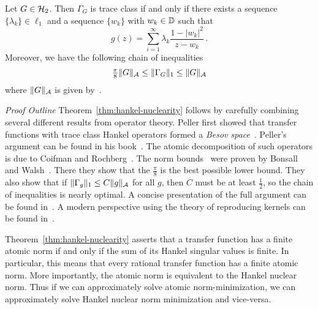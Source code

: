 \begin{theorem}\label{thm:hankel-nuclearity}
Let $G \in \mathcal{H}_2$.  Then $\Gamma_G$ is trace class if and only if there exists a sequence $\{\lambda_k\} \in \ell_1$ and a
    sequence $\{w_k\}$ with $w_k \in \mathbb{D}$ such that
\begin{equation}\label{eq:kernel-form}
    g(z) = \sum_{i=1}^\infty \lambda_k \frac{1-|w_k|^2}{z-w_k}\,.
    \end{equation}
Moreover, we have the following chain of inequalities
\begin{equation}\label{eq:norm-ineq-chain}
\tfrac{\pi}{8}\|G\|_{\mathcal{A}} \leq  \|\Gamma_G\|_1 \leq
\|G\|_{\mathcal{A}} 
\end{equation}
where  $\|G\|_{\mathcal{A}}$ is given by~.
\end{theorem}
\emph{Proof Outline}  Theorem~\ref{thm:hankel-nuclearity} follows by carefully combining several different results from operator theory. Peller first showed that transfer functions with trace class Hankel operators formed a \emph{Besov space}~\cite{Peller79}. Peller's argument can be found in his book~\cite{PellerHankelBook}. The atomic decomposition of such operators is due to Coifman and Rochberg~\cite{Coifman80}. The norm bounds~ were proven by Bonsall and Walsh~\cite{Bonsall86}. There they show that the $\tfrac{\pi}{8}$ is the best possible lower bound.  They also show that if $\|\Gamma_g\|_1\leq C\|g\|_{\mathcal{A}}$ for all $g$, then $C$ must be at least $\tfrac{1}{2}$, so the chain of inequalities is nearly optimal. A concise presentation of the full argument can be found  in~\cite{PartingtonHankelBook}. A modern perspective using the theory of reproducing kernels can be found in~\cite{ZhuBook}. 
\vspace{1mm}

\noindent Theorem~\ref{thm:hankel-nuclearity} asserts that a transfer function has a finite atomic norm if and only if the sum of its Hankel singular values is finite.  In particular, this means that every rational transfer function has a finite atomic norm.  More importantly, the atomic norm is equivalent to the Hankel nuclear norm.  Thus if we can approximately solve atomic norm-minimization, we can approximately solve Hankel nuclear norm minimization and vice-versa.

